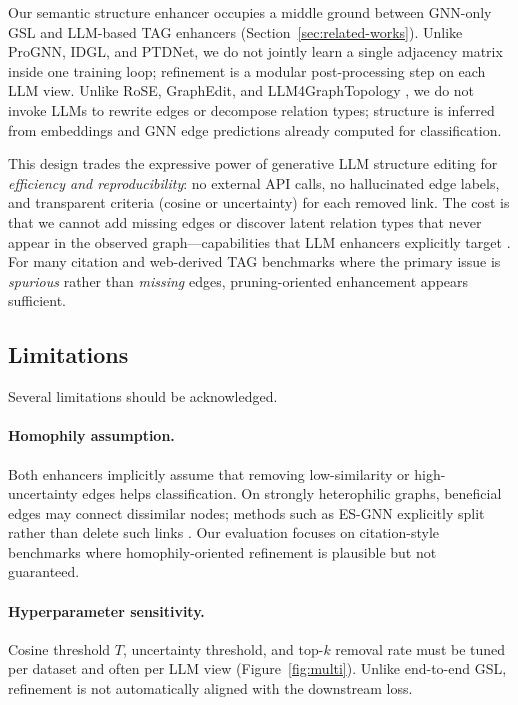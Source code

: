 \documentclass{article}
\begin{document}
Our semantic structure enhancer occupies a middle ground between GNN-only GSL and
LLM-based TAG enhancers (Section~\ref{sec:related-works}). Unlike ProGNN, IDGL, and
PTDNet, we do not jointly learn a single adjacency matrix inside one training loop;
refinement is a modular post-processing step on each LLM view. Unlike RoSE, GraphEdit, and
LLM4GraphTopology \citep{Sun2026TopologicalEnhancerTAG,guo2024graphedit}, we do not
invoke LLMs to rewrite edges or decompose relation types; structure is inferred from
embeddings and GNN edge predictions already computed for classification.

This design trades the expressive power of generative LLM structure editing for
\emph{efficiency and reproducibility}: no external API calls, no hallucinated edge
labels, and transparent criteria (cosine or uncertainty) for each removed link. The cost
is that we cannot add missing edges or discover latent relation types that never appear
in the observed graph---capabilities that LLM enhancers explicitly target
\citep{Sun2026TopologicalEnhancerTAG,Yu2025NodeGenerationTAG}. For many citation and
web-derived TAG benchmarks where the primary issue is \emph{spurious} rather than
\emph{missing} edges, pruning-oriented enhancement appears sufficient.


\subsection{Limitations}
\label{sec:disc-limitations}

Several limitations should be acknowledged.

\paragraph{Homophily assumption.}
Both enhancers implicitly assume that removing low-similarity or high-uncertainty edges
helps classification. On strongly heterophilic graphs, beneficial edges may connect
dissimilar nodes; methods such as ES-GNN explicitly split rather than delete such
links \citep{li2024esgnn}. Our evaluation focuses on citation-style benchmarks where
homophily-oriented refinement is plausible but not guaranteed.

\paragraph{Hyperparameter sensitivity.}
Cosine threshold $T$, uncertainty threshold, and top-$k$ removal rate must be tuned
per dataset and often per LLM view (Figure~\ref{fig:multi}). Unlike end-to-end GSL,
refinement is not automatically aligned with the downstream loss.
\end{document}
